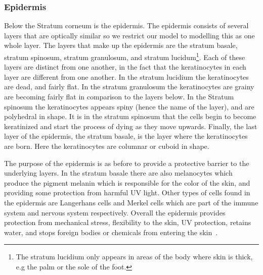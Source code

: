 \subsubsection*{Epidermis} %
\label{ssub:epidermis}

Below the Stratum corneum is the epidermis.
The epidermis consists of several layers that are optically similar so we restrict our model to modelling this as one whole layer.
The layers that make up the epidermis are the stratum basale, stratum spinosum, stratum granulosum, and stratum lucidum\footnote{The stratum lucidium only appears in areas of the body where skin is thick, e.g the palm or the sole of the foot.}.
Each of these layers are distinct from one another, in the fact that the keratinocytes in each layer are different from one another.
In the stratum lucidium the keratinocytes are dead, and fairly flat.
In the stratum granulosum the keratinocytes are grainy are becoming fairly flat in comparison to the layers below.
In the Stratum spinosum the keratinocytes appears spiny (hence the name of the layer), and are polyhedral in shape.
It is in the stratum spinosum that the cells begin to become keratinized and start the process of dying as they move upwards.
Finally, the last layer of the epidermis, the stratum basale, is the layer where the keratinocytes are born.
Here the keratinocytes are columnar or cuboid in shape.

The purpose of the epidermis is as before to provide a protective barrier to the underlying layers. 
In the stratum basale there are also melanocytes which produce the pigment melanin which is responsible for the color of the skin, and providing some protection from harmful UV light. 
Other types of cells found in the epidermis are Langerhans cells and Merkel cells which are part of the immune system and nervous system respectively.
Overall the epidermis provides protection from mechanical stress, flexibility to the skin, UV protection, retains water, and stops foreign bodies or chemicals from entering the skin~\cite{freedberg1999fitzpatrick,zaidi2010dermatology}.


